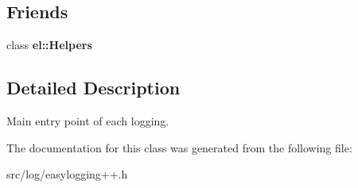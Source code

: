 \subsection*{Friends}
\begin{DoxyCompactItemize}
\item 
class {\bfseries el\+::\+Helpers}\hypertarget{classel_1_1base_1_1Writer_a2fb8a2c02cbf86247f093c118bed877a}{}\label{classel_1_1base_1_1Writer_a2fb8a2c02cbf86247f093c118bed877a}

\end{DoxyCompactItemize}


\subsection{Detailed Description}
Main entry point of each logging. 

The documentation for this class was generated from the following file\+:\begin{DoxyCompactItemize}
\item 
src/log/easylogging++.\+h\end{DoxyCompactItemize}
